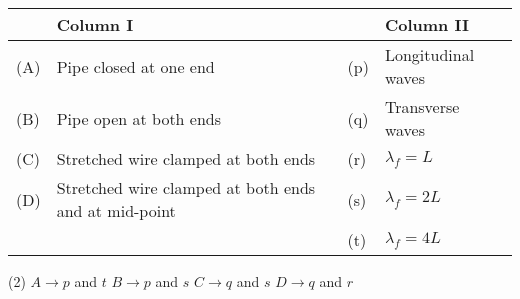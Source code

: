 \begin{center}
    \renewcommand{\arraystretch}{2}
    \begin{table}[h]
        \centering
        \begin{tabular}{p{0.25cm}p{8cm}|p{0.25cm}p{5cm}}
        \hline
        & Column I & &Column II \\
        \hline
        (A)& Pipe closed at one end & (p) &Longitudinal waves\\
        (B)& Pipe open at both ends & (q) &Transverse waves\\
        (C)& Stretched wire clamped at both ends & (r) &\( \lambda_f = L \)\\
        (D)& Stretched wire clamped at both ends and at mid-point & (s) &\( \lambda_f = 2L \)\\
        & & (t) &\( \lambda_f = 4L \)\\
        \hline
        \end{tabular}
    \end{table}
\end{center}

\begin{tasks}(2)
    \task \( A \rightarrow p \) and \( t \)
    \task \( B \rightarrow p \) and \( s \)
    \task \( C \rightarrow q \) and \( s \)
    \task \( D \rightarrow q \) and \( r \)
\end{tasks}